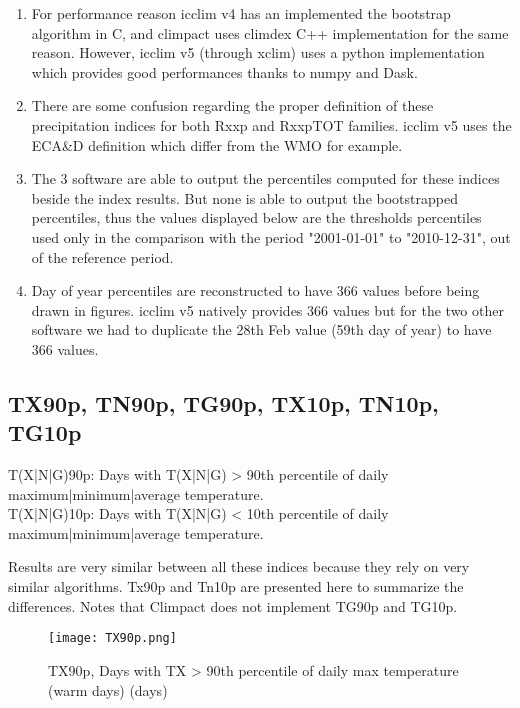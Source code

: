 \documentclass[a4paper,11pt]{article}
\begin{document}
        \begin{enumerate}
            \item For performance reason icclim v4 has an implemented the bootstrap algorithm in C, and climpact uses climdex C++ implementation for the same reason. However, icclim v5 (through xclim) uses a python implementation which provides good performances thanks to numpy and Dask.
            \item There are some confusion regarding the proper definition of these precipitation indices for both Rxxp and RxxpTOT families. icclim v5 uses the ECA\&D definition which differ from the WMO for example.
            \item The 3 software are able to output the percentiles computed for these indices beside the index results. But none is able to output the bootstrapped percentiles, thus the values displayed below are the thresholds percentiles used only in the comparison with the period "2001-01-01" to "2010-12-31", out of the reference period.
            \item Day of year percentiles are reconstructed to have 366 values before being drawn in figures. icclim v5 natively provides 366 values but for the two other software we had to duplicate the 28th Feb value (59th day of year) to have 366 values.
        \end{enumerate}


    \subsection{TX90p, TN90p, TG90p, TX10p, TN10p, TG10p}
        T(X|N|G)90p: Days with T(X|N|G) > 90th percentile of daily maximum|minimum|average temperature.\\
        T(X|N|G)10p: Days with T(X|N|G) < 10th percentile of daily maximum|minimum|average temperature.


        Results are very similar between all these indices because they rely on very similar algorithms. 
        Tx90p and Tn10p are presented here to summarize the differences.
        Notes that Climpact does not implement TG90p and TG10p.

        \begin{figure}[!hbt]
            \centering
            \texttt{[image: TX90p.png]}
            \caption{TX90p, Days with TX > 90th percentile of daily max temperature (warm days) (days)}
            \label{figure/tx90p}
        \end{figure}
\end{document}
